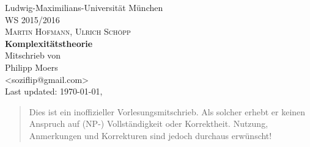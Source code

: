 \documentclass[12pt, oneside, a4paper, numbers=enddot, abstracton]{scrreprt}
\begin{document}

\begin{titlepage}
    \begin{center}
        \Large{Ludwig-Maximilians-Universität München}\\[1cm]
        \large{\scshape{WS 2015/2016}}\\
        \large{\scshape{Martin Hofmann, Ulrich Schöpp}}\\[3cm]
        \Huge{\textbf{Komplexitätstheorie}}\\[6cm]
        \large{Mitschrieb von}\\[1cm]
        \large{Philipp Moers \\ <soziflip@gmail.com>}\\[3cm]
        \vfill
        \footnotesize{Last updated: \today, \currenttime}
    \end{center}
\end{titlepage}

\begin{abstract}
    Dies ist ein inoffizieller Vorlesungsmitschrieb. Als solcher erhebt er keinen Anspruch auf (NP-) Vollständigkeit oder Korrektheit. Nutzung, Anmerkungen und Korrekturen sind jedoch durchaus erwünscht! 
\end{abstract}


\tableofcontents


\newpage



% 
% 
% 
% 
% 
\end{document}
